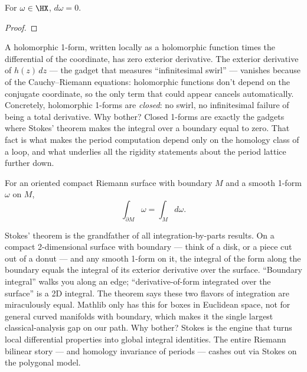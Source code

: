 \begin{lemma}
\label{lem:holomorphic-form-is-closed}
For \(\omega\in\HX\), \(d\omega=0\).
\leanok
\end{lemma}
\begin{proof}\leanok\end{proof}

\begin{layman}
A holomorphic 1-form, written locally as a holomorphic function times the
differential of the coordinate, has zero exterior derivative. The
exterior derivative of \(h(z)\,dz\) — the gadget that measures
``infinitesimal swirl'' — vanishes because of the Cauchy–Riemann
equations: holomorphic functions don't depend on the conjugate
coordinate, so the only term that could appear cancels automatically.
Concretely, holomorphic 1-forms are \emph{closed}: no swirl, no
infinitesimal failure of being a total derivative. Why bother? Closed
1-forms are exactly the gadgets where Stokes' theorem makes the integral
over a boundary equal to zero. That fact is what makes the period
computation depend only on the homology class of a loop, and what
underlies all the rigidity statements about the period lattice further
down.
\end{layman}

\begin{theorem}
\label{thm:stokes-on-rs-with-boundary}
For an oriented compact Riemann surface with boundary \(M\) and a smooth
1-form \(\omega\) on \(M\),
\[
  \int_{\partial M}\omega = \int_{M} d\omega.
\]
\leanok
\end{theorem}

\begin{layman}
Stokes' theorem is the grandfather of all integration-by-parts results.
On a compact 2-dimensional surface with boundary — think of a disk, or
a piece cut out of a donut — and any smooth 1-form on it, the integral
of the form along the boundary equals the integral of its exterior
derivative over the surface. ``Boundary integral'' walks you along an
edge; ``derivative-of-form integrated over the surface'' is a 2D
integral. The theorem says these two flavors of integration are
miraculously equal. Mathlib only has this for boxes in Euclidean space,
not for general curved manifolds with boundary, which makes it the
single largest classical-analysis gap on our path. Why bother? Stokes
is the engine that turns local differential properties into global
integral identities. The entire Riemann bilinear story — and homology
invariance of periods — cashes out via Stokes on the polygonal model.
\end{layman}

